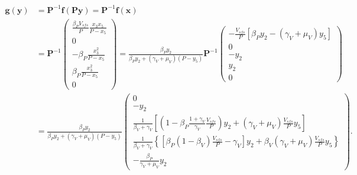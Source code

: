 \documentclass{article}
\newcommand{\mat}[1]{\mathbf{#1}}
\renewcommand{\vec}[1]{\mathbf{#1}}
\begin{document}
\begin{equation}
  \begin{split}
    \vec{g}(\vec{y}) &= \mat{P}^{-1} \vec{f}(\mat{P} \vec{y})
    = \mat{P}^{-1} \vec{f}(\vec{x})
    \\
    &=
    \mat{P}^{-1}
    \begin{pmatrix}
      \frac{\beta_P V_{sfs}}{P} \frac{x_3 x_5}{P - x_5}
      \\
      0
      \\
      - \beta_P \frac{x_3^2}{P - x_5}
      \\
      \beta_P \frac{x_3^2}{P - x_5}
      \\
      0
    \end{pmatrix}
    =
    \frac{\beta_P y_2}{\beta_P y_2 + (\gamma_V + \mu_V) (P - y_5)}
    \mat{P}^{-1}
    \begin{pmatrix}
      - \frac{V_{sfs}}{P} \left[\beta_P y_2 - (\gamma_V + \mu_V) y_5\right]
      \\
      0
      \\
      - y_2
      \\
      y_2
      \\
      0
    \end{pmatrix}
    \\
    &=
    \frac{\beta_P y_2}{\beta_P y_2 + (\gamma_V + \mu_V) (P - y_5)}
    \begin{pmatrix}
      0
      \\
      - y_2
      \\
      \frac{1}{\beta_V + \gamma_V} \left[
        \left(
          1 - \beta_P \frac{1 + \gamma_V}{\gamma_V} \frac{V_{sfs}}{P}
        \right) y_2
        + (\gamma_V + \mu_V) \frac{V_{sfs}}{P} y_5
      \right]
      \\
      \frac{1}{\beta_V + \gamma_V}
      \left\{
        \left[
          \beta_P (1 - \beta_V) \frac{V_{sfs}}{P}
          - \gamma_V
        \right] y_2
        + \beta_V (\gamma_V + \mu_V) \frac{V_{sfs}}{P} y_5
      \right\}
      \\
      - \frac{\beta_P}{\gamma_V + \mu_V} y_2
    \end{pmatrix}.
  \end{split}
\end{equation}
\end{document}
